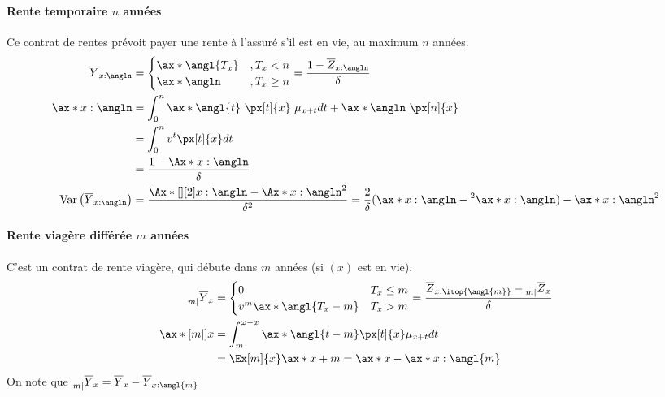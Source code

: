 \documentclass[10pt, french]{article}
\begin{document}
\begin{multicols*}{3}
\paragraph{Rente temporaire $n$ années} Ce contrat de rentes prévoit payer une rente à l'assuré s'il est en vie, au maximum $n$ années.
\begin{align*}
\overline{Y}_{x:\angln} & = \begin{cases}
\ax*{\angl{T_x}}	& , T_x < n \\
\ax*{\angln}			& , T_x \geq n \\
\end{cases} 
= \frac{1  - \overline{Z}_{x:\angln}}{\delta} \\
\ax*{x:\angln}	
	& = \int_{0}^{n} \ax*{\angl{t}} \  \px[t]{x} \  \mu_{x+t} dt + \ax*{\angln} \ \px[n]{x} \\
	& = \int_{0}^{n} v^t \px[t]{x} dt \\
	& = \frac{1 - \Ax*{x:\angln}}{\delta} \\
\variance{\overline{Y}_{x:\angln}}	
	& = 	\frac{\Ax*[][2]{x:\angln} - \Ax*{x:\angln}^2}{\delta^2} 
	=	\frac{2}{\delta} (\ax*{x:\angln} - \prescript{2}{}{\ax*{x:\angln}}) - \ax*{x:\angln}^2
\end{align*}

\paragraph{Rente viagère différée $m$ années} C'est un contrat de rente viagère, qui débute dans $m$ années (si $(x)$ est en vie).
\begin{align*}
\prescript{}{m|}{\overline{Y}}_{x} & = \begin{cases}
0						& T_x	 	\leq 	 	m	\\
v^m \ax*{\angl{T_x - m}}	& T_x 	 	>			m	\\
\end{cases} 
= \frac{\overline{Z}_{x:\itop{\angl{m}}} - \prescript{}{m|}{\overline{Z}}_{x}}{\delta} \\ 
\ax*[m|]{x}	
	& = \int_{m}^{\omega - x} \ax*{\angl{t - m}} \px[t]{x} \mu_{x+t} dt \\
	& = \Ex[m]{x} \ax*{x+m} 
	 = \ax*{x} - \ax*{x:\angl{m}} 
\end{align*}
On note que $\prescript{}{m|}{\overline{Y}}_{x} = \overline{Y}_{x} - \overline{Y}_{x:\angl{m}}$


\end{multicols*}
\end{document}
